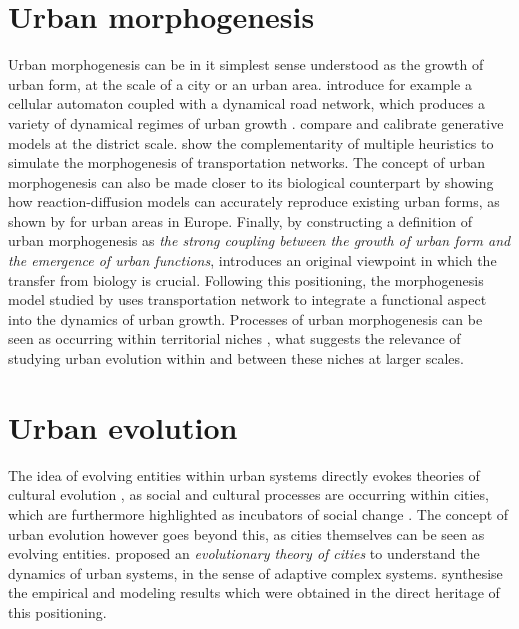 \documentclass[letterpaper]{article}
\begin{document}
\section{Urban morphogenesis}

Urban morphogenesis can be in it simplest sense understood as the growth of urban form, at the scale of a city or an urban area. \cite{raimbault2014hybrid} introduce for example a cellular automaton coupled with a dynamical road network, which produces a variety of dynamical regimes of urban growth \citep{raimbault2017identification}. \cite{raimbault2019generating} compare and calibrate generative models at the district scale. \cite{raimbault2018multi} show the complementarity of multiple heuristics to simulate the morphogenesis of transportation networks. The concept of urban morphogenesis can also be made closer to its biological counterpart by showing how reaction-diffusion models can accurately reproduce existing urban forms, as shown by \cite{raimbault2018calibration} for urban areas in Europe. Finally, by constructing a definition of urban morphogenesis as \emph{the strong coupling between the growth of urban form and the emergence of urban functions}, \cite{raimbault2018caracterisation} introduces an original viewpoint in which the transfer from biology is crucial. Following this positioning, the morphogenesis model studied by \cite{raimbault2019urban} uses transportation network to integrate a functional aspect into the dynamics of urban growth. Processes of urban morphogenesis can be seen as occurring within territorial niches \citep{holland2012signals}, what suggests the relevance of studying urban evolution within and between these niches at larger scales.

\section{Urban evolution}

The idea of evolving entities within urban systems directly evokes theories of cultural evolution \citep{mesoudi2016cultural}, as social and cultural processes are occurring within cities, which are furthermore highlighted as incubators of social change \citep{pumain2019complexity}. The concept of urban evolution however goes beyond this, as cities themselves can be seen as evolving entities. \cite{pumain1997pour} proposed an \emph{evolutionary theory of cities} to understand the dynamics of urban systems, in the sense of adaptive complex systems. \cite{pumain2017urban} synthesise the empirical and modeling results which were obtained in the direct heritage of this positioning.
\end{document}
